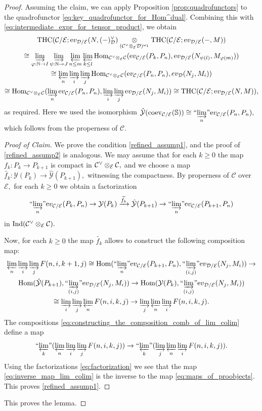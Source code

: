 \documentclass[11pt,leqno]{amsart}
\numberwithin{equation}{section}
\def\N{\mathbb{N}}
\def\bS{\mathbb{S}}
\def\wt{\widetilde}
\def\Hom{\operatorname{Hom}}
\newcommand{\tens}[1]{%
  \mathbin{\mathop{\otimes}\displaylimits_{#1}}%
}
\newcommand{\indlim}[1][]{\mathop{\varinjlim}\limits_{#1}}
\newcommand{\inddlim}[1][]{{``{\indlim[#1]}"}}
\newcommand{\prolim}[1][]{\mathop{\varprojlim}\limits_{#1}}
\newcommand{\proolim}[1][]{{``{\prolim[#1]}"}}
\newcommand{\xto}{\xrightarrow}
\newcommand{\ev}{\mathrm ev}
\newcommand{\cD}{{\mathcal D}}
\newcommand{\cC}{{\mathcal C}}
\newcommand{\cE}{{\mathcal E}}
\newcommand{\cY}{{\mathcal Y}}
\newcommand{\THC}{\operatorname{THC}}
\newcommand{\Ind}{\operatorname{Ind}}
\newcommand{\coev}{\operatorname{coev}}
\begin{document}
\begin{proof}
Assuming the claim, we can apply Proposition \ref{prop:quadrofunctors} to the quadrofunctor \eqref{eq:key_quadrofunctor_for_Hom^dual}. Combining this with \eqref{eq:intermediate_expr_for_tensor_product}, we obtain
\begin{multline*}
\THC(\cC/\cE;\ev_{\cD/\cE}(N,(-)_{\cD}^{\vee})\tens{(\cC^{\vee}\tens{\cE}\cD)^{\omega_1}} \THC(\cC/\cE;\ev_{\cD/\cE}(-,M))\\
\cong \indlim[\varphi:\N\to I]\indlim[\psi:\N\to J]\prolim[n\leq m] \prolim[k\leq l] \Hom_{\cC^{\vee}\tens{\cE}\cC}(\ev_{\cC/\cE}(P_k,P_n),\ev_{\cD/\cE}(N_{\psi(l)},M_{\varphi(m)}))\\
\cong \prolim[n]\indlim[i]\indlim[j] \Hom_{\cC^{\vee}\tens{\cE}\cC}(\ev_{\cC/\cE}(P_n,P_n),ev_{\cD}(N_j,M_i))\\
\cong \Hom_{\cC^{\vee}\tens{\cE}\cC}(\indlim[n]\ev_{\cC/\cE}(P_n,P_n),\indlim[i]\indlim[j]\ev_{\cD/\cE}(N_j,M_i))\cong \THC(\cC/\cE;\ev_{\cD/\cE}(N,M)),
\end{multline*}
as required. Here we used the isomorphism $\hat{\cY}(\coev_{\cC/\cE}(\bS))\cong\inddlim[n]\ev_{\cC/\cE}(P_n,P_n),$ which follows from the properness of $\cC.$ 
\begin{proof}[Proof of Claim] We prove the condition \ref{refined_assump1}, and the proof of \ref{refined_assump2} is analogous. We may assume that for each $k\geq 0$ the map $f_k:P_k\to P_{k+1}$ is compact in $\cC^{\vee}\tens{\cE}\cC,$ and we choose a map $\wt{f_k}:\cY(P_k)\to\hat{\cY}(P_{k+1}),$ witnessing the compactness. By properness of $\cC$ over $\cE,$ for each $k\geq 0$ we obtain a factorization \begin{equation}\label{eq:factorization} \inddlim[n]\ev_{\cC/\cE}(P_k,P_n)\to \cY(P_k)\xto{\wt{f_k}} \hat{\cY}(P_{k+1})\to \inddlim[n]\ev_{\cC/\cE}(P_{k+1},P_n)\end{equation}
in $\Ind(\cC^{\vee}\tens{\cE}\cC).$ 
	
Now, for each $k\geq 0$  the map $\wt{f_k}$ allows to construct the following composition map:
\begin{multline}\label{eq:constructing_the_composition_comb_of_lim_colim}
\prolim[n]\indlim[i]\indlim[j] F(n,i,k+1,j)\cong \Hom(\inddlim[n]\ev_{\cC/\cE}(P_{k+1},P_n),\inddlim[(i,j)]\ev_{\cD/\cE}(N_j,M_i))\to \\
\Hom(\hat{\cY}(P_{k+1}),\inddlim[(i,j)]\ev_{\cD/\cE}(N_j,M_i))\to \Hom(\cY(P_k),\inddlim[(i,j)]\ev_{\cD/\cE}(N_j,M_i))\\
\cong \indlim[i]\indlim[j]\prolim[n]F(n,i,k,j)\to \indlim[j]\prolim[n]\indlim[i]F(n,i,k,j). 
\end{multline} 
The compositions \eqref{eq:constructing_the_composition_comb_of_lim_colim} define a map 
\begin{equation}\label{eq:inverse_map_lim_colim}
\proolim[k](\prolim[n]\indlim[i]\indlim[j]F(n,i,k,j))\to \proolim[k](\indlim[j]\prolim[n]\indlim[i]F(n,i,k,j)).\end{equation}
Using the factorizations \eqref{eq:factorization} we see that the map \eqref{eq:inverse_map_lim_colim} is the inverse to the map \eqref{eq:maps_of_proobjects}. This proves \ref{refined_assump1}.
\end{proof}
This proves the lemma.
\end{proof}
\end{document}
